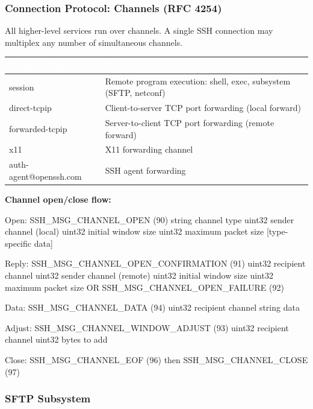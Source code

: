\documentclass[11pt,letterpaper]{article}
\newcommand{\tableheader}[1]{\textbf{\sffamily\textcolor{white}{#1}}}
\begin{document}
\subsubsection{Connection Protocol: Channels (RFC 4254)}

All higher-level services run over channels. A single SSH connection may multiplex any number of simultaneous channels.

\begin{center}
\begin{tabularx}{\textwidth}{L{3cm}X}
\toprule
{}
\tableheader{Channel Type} & \tableheader{Use} \\
\midrule
session & Remote program execution: shell, exec, subsystem (SFTP, netconf) \\
direct-tcpip & Client-to-server TCP port forwarding (local forward) \\
forwarded-tcpip & Server-to-client TCP port forwarding (remote forward) \\
x11 & X11 forwarding channel \\
auth-agent@openssh.com & SSH agent forwarding \\
\bottomrule
\end{tabularx}
\end{center}

\textbf{Channel open/close flow:}
\begin{asciibox}
Open:   SSH_MSG_CHANNEL_OPEN (90)
          string  channel type
          uint32  sender channel (local)
          uint32  initial window size
          uint32  maximum packet size
          [type-specific data]

Reply:  SSH_MSG_CHANNEL_OPEN_CONFIRMATION (91)
          uint32  recipient channel
          uint32  sender channel (remote)
          uint32  initial window size
          uint32  maximum packet size
        OR SSH_MSG_CHANNEL_OPEN_FAILURE (92)

Data:   SSH_MSG_CHANNEL_DATA (94)
          uint32  recipient channel
          string  data

Adjust: SSH_MSG_CHANNEL_WINDOW_ADJUST (93)
          uint32  recipient channel
          uint32  bytes to add

Close:  SSH_MSG_CHANNEL_EOF (96) then SSH_MSG_CHANNEL_CLOSE (97)
\end{asciibox}

\subsubsection{SFTP Subsystem}
\end{document}
